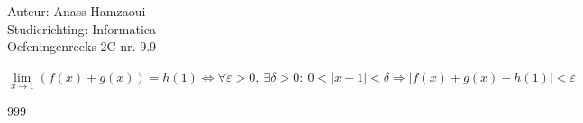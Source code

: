 \documentclass[a4paper]{article}
\begin{document}
  
\noindent \large Auteur: Anass Hamzaoui \\
\noindent \large Studierichting: Informatica\\
\noindent \large Oefeningenreeks 2C nr. 9.9\\
\medskip
\normalsize

$\lim\limits_{x \to 1} \left(f(x)+g(x)\right)=h(1)
\Leftrightarrow
\forall \varepsilon>0,\ \exists \delta>0:\ 
0<|x-1|<\delta \Rightarrow |f(x)+g(x)-h(1)|<\varepsilon$

\begin{thebibliography}{999}
\end{thebibliography}
\end{document}

